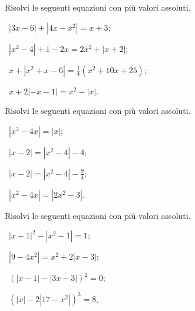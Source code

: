 \begin{esercizio}[\Ast]
 \label{ese:7.21}
Risolvi le seguenti equazioni con più valori assoluti.
\begin{multicols}{2}
 \begin{enumeratea}
 \item~$\left|3x-6\right|+\left|4x-x^2\right|=x+3$;
 \item~$\left|x^2-4\right|+1-2x=2x^2+\left|x+2\right|$;
 \item~$x+\left|x^2+x-6\right|=\frac 1 4(x^2+10x+25)$;
 \item~$x+2\left|-x-1\right|=x^2-\left|x\right|$.
 \end{enumeratea}
 \end{multicols}
\end{esercizio}

\begin{esercizio}[\Ast]
 \label{ese:7.22}
Risolvi le seguenti equazioni con più valori assoluti.
\begin{multicols}{2}
 \begin{enumeratea}
 \item~$\left|x^3-4x\right|=\left|x\right|$;
 \item~$\left|x-2\right|=\left|x^2-4\right|-4$;
 \item~$\left|x-2\right|=\left|x^2-4\right|-\frac 9 4$;
 \item~$\left|x^2-4x\right|=\left|2x^2-3\right|$.
 \end{enumeratea}
 \end{multicols}
\end{esercizio}

\begin{esercizio}[\Ast]
 \label{ese:7.23}
Risolvi le seguenti equazioni con più valori assoluti.
\begin{multicols}{2}
 \begin{enumeratea}
 \item~$\left|x-1\right|^2-\left|x^2-1\right|=1$;
 \item~$\left|9-4x^2\right|=x^2+2\left|x-3\right|$;
 \item~$(\left|x-1\right|-\left|3x-3\right|)^2=0$;
 \item~$\left(\left|x\right|-2\left|17-x^2\right|\right)^3=8$.
 \end{enumeratea}
 \end{multicols}
\end{esercizio}

